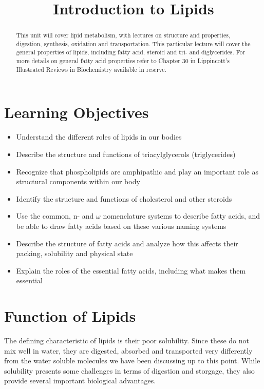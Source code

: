 \documentclass{tufte-handout}
\title{Introduction to Lipids}
\author{}
\date{}  %
\begin{document}
\maketitle%

\begin{abstract}
\noindent This unit will cover lipid metabolism, with lectures on structure and properties, digestion, synthesis, oxidation and transportation.  This particular lecture will cover the general properties of lipids, including fatty acid, steroid and tri- and diglycerides.  For more details on general fatty acid properties refer to Chapter 30 in Lippincott's Illustrated Reviews in Biochemistry available in reserve\cite{Ferrier2017}.
\end{abstract}

\tableofcontents

\pagebreak
\section{Learning Objectives}

\begin{itemize}
\item Understand the different roles of lipids in our bodies
\item Describe the structure and functions of triacylglycerols (triglycerides)
\item Recognize that phospholipids are amphipathic and play an important role as structural components within our body
\item Identify the structure and functions of cholesterol and other steroids
\item Use the common, n- and $\omega$ nomenclature systems to describe fatty acids, and be able to draw fatty acids based on these various naming systems
\item Describe the structure of fatty acids and analyze how this affects their packing, solubility and physical state
\item Explain the roles of the essential fatty acids, including what makes them essential

\end{itemize}

\section{Function of Lipids}

The defining characteristic of lipids is their poor solubility.  Since these do not mix well in water, they are digested, absorbed and transported very differently from the water soluble molecules we have been discussing up to this point.  While solubility presents some challenges in terms of digestion and storgage, they also provide several important biological advantages.
\end{document}
